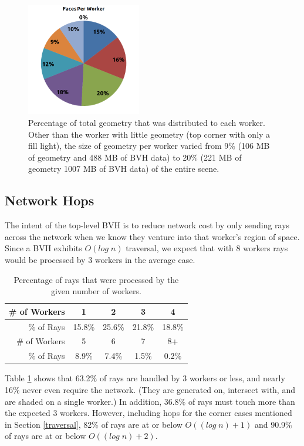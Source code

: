 \documentclass[a4paper,twoside]{article}
\begin{document}
\begin{figure}[h!]
    \centering
    \includegraphics[width=50mm]{figures/facesperworker.png}
    \caption{Percentage of total geometry that was distributed to each worker. Other than the worker with little geometry (top corner with only a fill light), the size of geometry per worker varied from 9\% (106 MB of geometry and 488 MB of BVH data) to 20\% (221 MB of geometry 1007 MB of BVH data) of the entire scene.}
    \label{fig:geomdist}
\end{figure}

\subsection{Network Hops}
\label{networkhops}

The intent of the top-level BVH is to reduce network cost by only sending rays
across the network when we know they venture into that worker's region of space.
Since a BVH exhibits $O(log\;n)$ traversal, we expect that with 8 workers rays
would be processed by 3 workers in the average case.

\begin{table}
\begin{center}
\begin{tabular}{|r||c|c|c|c|}
    \hline
    \# of Workers& 1 & 2 & 3 & 4 \\
    \hline
    \% of Rays & 15.8\% & 25.6\% & 21.8\% & 18.8\% \\
    \hline
    \hline
    \# of Workers & 5 & 6 & 7 & 8+ \\
    \hline
    \% of Rays & 8.9\% & 7.4\% & 1.5\% & 0.2\% \\
    \hline
\end{tabular}
\caption{Percentage of rays that were processed by the given number of workers.}
\label{tb:nethopspercent}
\end{center}
\end{table}

Table \ref{tb:nethopspercent} shows that 63.2\% of rays are handled by 3 workers
or less, and nearly 16\% never even require the network. (They are generated on,
intersect with, and are shaded on a single worker.) In addition, 36.8\% of
rays must touch more than the expected 3 workers. However, including hops for
the corner cases mentioned in Section \ref{traversal}, 82\% of rays are at
or below $O((log\;n) + 1)$ and 90.9\% of rays are at or below $O((log\;n) + 2)$.
\end{document}
